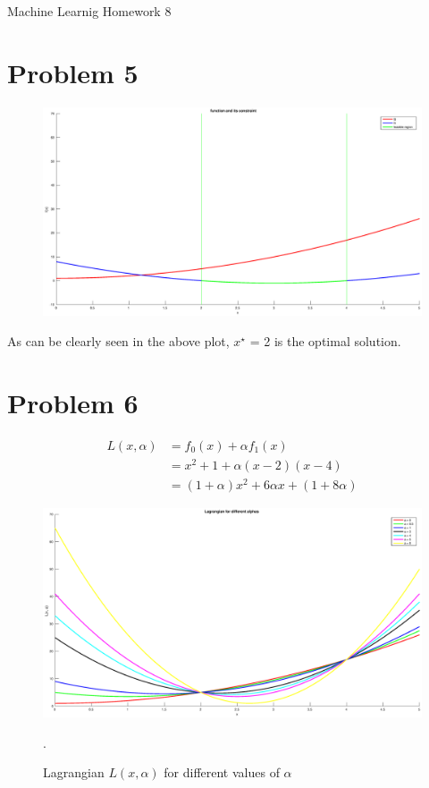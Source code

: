 \documentclass[12pt]{article}
\begin{document}
\begin{center}
{\Large Machine Learnig Homework 8} \\[.3in]
\end{center}
\vspace*{.5in}

\section*{Problem 5}

\begin{figure}[!ht]
 \center
 \includegraphics[width=\textwidth]{prob5}
 \label{fig:primal}
\end{figure}

As can be clearly seen in the above plot, $x^\star$ = 2 is the optimal solution.

\section*{Problem 6}

\begin{equation}
 \begin{align}
  L(x, \alpha) &= f_0(x) + \alpha f_1(x) \\
    &= x^2 + 1 + \alpha (x-2)(x-4) \\
    &= (1 + \alpha) x^2 + 6 \alpha x + (1 + 8 \alpha)
 \end{align}
\end{equation}



\begin{figure}[!ht] \label{fig:prob6}
 \center
 \includegraphics[width=\textwidth]{prob6}
 \caption{Lagrangian $L(x, \alpha)$ for different values of $\alpha$}.
\end{figure}
\end{document}
